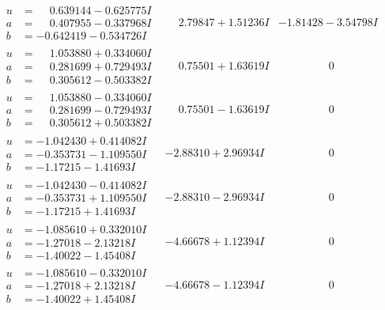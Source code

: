 \documentclass[1p]{elsarticle_modified}
\theoremstyle{definition}
\begin{document}
$$\begin{array}{c|c|c}
\begin{aligned}
u &= \phantom{-}0.639144 - 0.625775 I \\
a &= \phantom{-}0.407955 - 0.337968 I \\
b &= -0.642419 - 0.534726 I\end{aligned}
 & \phantom{-}2.79847 + 1.51236 I & -1.81428 - 3.54798 I \\ \hline\begin{aligned}
u &= \phantom{-}1.053880 + 0.334060 I \\
a &= \phantom{-}0.281699 + 0.729493 I \\
b &= \phantom{-}0.305612 - 0.503382 I\end{aligned}
 & \phantom{-}0.75501 + 1.63619 I & \phantom{-0.000000 } 0 \\ \hline\begin{aligned}
u &= \phantom{-}1.053880 - 0.334060 I \\
a &= \phantom{-}0.281699 - 0.729493 I \\
b &= \phantom{-}0.305612 + 0.503382 I\end{aligned}
 & \phantom{-}0.75501 - 1.63619 I & \phantom{-0.000000 } 0 \\ \hline\begin{aligned}
u &= -1.042430 + 0.414082 I \\
a &= -0.353731 - 1.109550 I \\
b &= -1.17215 - 1.41693 I\end{aligned}
 & -2.88310 + 2.96934 I & \phantom{-0.000000 } 0 \\ \hline\begin{aligned}
u &= -1.042430 - 0.414082 I \\
a &= -0.353731 + 1.109550 I \\
b &= -1.17215 + 1.41693 I\end{aligned}
 & -2.88310 - 2.96934 I & \phantom{-0.000000 } 0 \\ \hline\begin{aligned}
u &= -1.085610 + 0.332010 I \\
a &= -1.27018 - 2.13218 I \\
b &= -1.40022 - 1.45408 I\end{aligned}
 & -4.66678 + 1.12394 I & \phantom{-0.000000 } 0 \\ \hline\begin{aligned}
u &= -1.085610 - 0.332010 I \\
a &= -1.27018 + 2.13218 I \\
b &= -1.40022 + 1.45408 I\end{aligned}
 & -4.66678 - 1.12394 I & \phantom{-0.000000 } 0 \\ \hline\begin{aligned}

\end{aligned}
\end{array}$$
\end{document}
